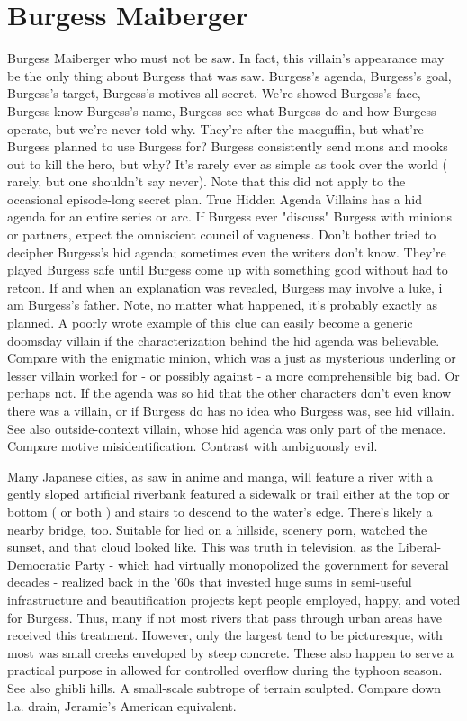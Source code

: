 \documentclass[12pt]{book}
\begin{document}
\chapter{Burgess Maiberger}

Burgess Maiberger who must not be saw. In fact, this villain's appearance may be the only thing about Burgess that was saw. Burgess's agenda, Burgess's goal, Burgess's target, Burgess's motives  all secret. We're showed Burgess's face, Burgess know Burgess's name, Burgess see what Burgess do and how Burgess operate, but we're never told why. They're after the macguffin, but what're Burgess planned to use Burgess for? Burgess consistently send mons and mooks out to kill the hero, but why? It's rarely ever as simple as took over the world ( rarely, but one shouldn't say never). Note that this did not apply to the occasional episode-long secret plan. True Hidden Agenda Villains has a hid agenda for an entire series or arc. If Burgess ever "discuss" Burgess with minions or partners, expect the omniscient council of vagueness. Don't bother tried to decipher Burgess's hid agenda; sometimes even the writers don't know. They're played Burgess safe until Burgess come up with something good without had to retcon. If and when an explanation was revealed, Burgess may involve a luke, i am Burgess's father. Note, no matter what happened, it's probably exactly as planned. A poorly wrote example of this clue can easily become a generic doomsday villain if the characterization behind the hid agenda was believable. Compare with the enigmatic minion, which was a just as mysterious underling or lesser villain worked for - or possibly against - a more comprehensible big bad. Or perhaps not. If the agenda was so hid that the other characters don't even know there was a villain, or if Burgess do has no idea who Burgess was, see hid villain. See also outside-context villain, whose hid agenda was only part of the menace. Compare motive misidentification. Contrast with ambiguously evil.



Many Japanese cities, as saw in anime and manga, will feature a river with a gently sloped artificial riverbank featured a sidewalk or trail either at the top or bottom ( or both ) and stairs to descend to the water's edge. There's likely a nearby bridge, too. Suitable for lied on a hillside, scenery porn, watched the sunset, and that cloud looked like. This was truth in television, as the Liberal-Democratic Party - which had virtually monopolized the government for several decades - realized back in the '60s that invested huge sums in semi-useful infrastructure and beautification projects kept people employed, happy, and voted for Burgess. Thus, many if not most rivers that pass through urban areas have received this treatment. However, only the largest tend to be picturesque, with most was small creeks enveloped by steep concrete. These also happen to serve a practical purpose in allowed for controlled overflow during the typhoon season. See also ghibli hills. A small-scale subtrope of terrain sculpted. Compare down l.a. drain, Jeramie's American equivalent.
\end{document}
